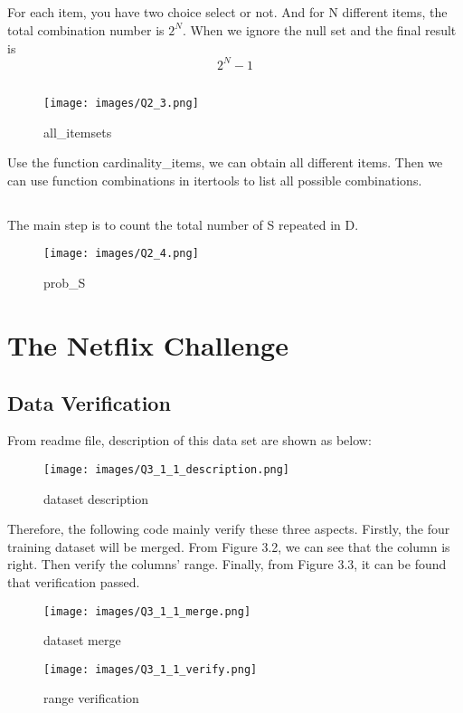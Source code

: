 \documentclass[paper=a4, fontsize=11pt]{scrartcl} %
\begin{document}
 \subsection{}
 For each item, you have two choice select or not. And for N different items, the total combination number is $2^N$. When we ignore the null set and the final result is   
    $$2^N - 1$$
    
\subsection{}
\begin{figure}[htbp]
    \centering
    \texttt{[image: images/Q2\_3.png]}
    \caption{all\_itemsets}
    \label{fig:data-files}
    \end{figure}
Use the function cardinality\_items, we can obtain all different items. Then we can use function combinations in itertools to list all possible combinations.
    
  
\subsection{}
The main step is to count the total number of S repeated in D.
    \begin{figure}[htbp]
    \centering
    \texttt{[image: images/Q2\_4.png]}
    \caption{prob\_S}
    \label{fig:data-files}
    \end{figure}

    


\section{The Netflix Challenge}


\subsection{Data Verification}
From readme file, description of this data set are shown as below:
\begin{figure}[htbp]
    \centering
    \texttt{[image: images/Q3\_1\_1\_description.png]}
    \caption{dataset description}
    \label{fig:data-files}
    \end{figure}
Therefore, the following code mainly verify these three aspects. Firstly, the four training dataset will be merged. From Figure 3.2, we can see that the column is right. Then verify the columns' range. Finally, from Figure 3.3, it can be found that verification passed. 
\begin{figure}[htbp]
    \centering
    \texttt{[image: images/Q3\_1\_1\_merge.png]}
    \caption{dataset merge}
    \label{fig:data-files}
    \end{figure}
\begin{figure}[htbp]
    \centering
    \texttt{[image: images/Q3\_1\_1\_verify.png]}
    \caption{range verification}
    \label{fig:data-files}
    \end{figure}
\end{document}
